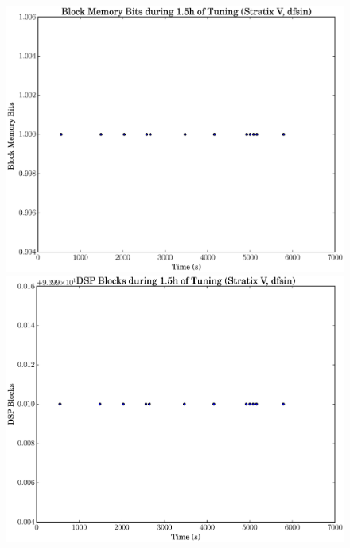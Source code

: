 \documentclass[12pt, a4paper]{article}
\begin{document}
\begin{figure}[htpb]
    \begin{minipage}{.48\textwidth}
        \includegraphics[scale=.25]{dfsin_block_5400_chstone_StratixV}
    \end{minipage}%
    \hfill
    \begin{minipage}{.48\textwidth}
        \includegraphics[scale=.25]{dfsin_dsp_5400_chstone_StratixV}
    \end{minipage}%


\end{figure}
\end{document}
